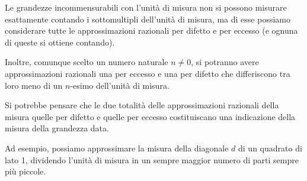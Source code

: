 Le grandezze incommensurabili con l'unità di misura non si possono misurare 
esattamente contando i sottomultipli dell'unità di misura, ma di esse 
possiamo considerare tutte le approssimazioni razionali per difetto e 
per eccesso (e ognuna di queste si ottiene contando). 

Inoltre, comunque scelto un numero naturale  \(n \neq 0\), 
si potranno avere approssimazioni razionali una per eccesso e una per difetto 
che differiscono tra loro meno di un \(n\)-esimo dell'unità di misura.

Si potrebbe pensare che le due totalità delle approssimazioni razionali 
della misura quelle per difetto e quelle per eccesso costituiscano una 
indicazione della misura della grandezza data.

Ad esempio, possiamo approssimare la misura della diagonale \(d\) di un 
quadrato di lato 1, dividendo l’unità di misura in un sempre maggior 
numero di parti sempre più piccole.


